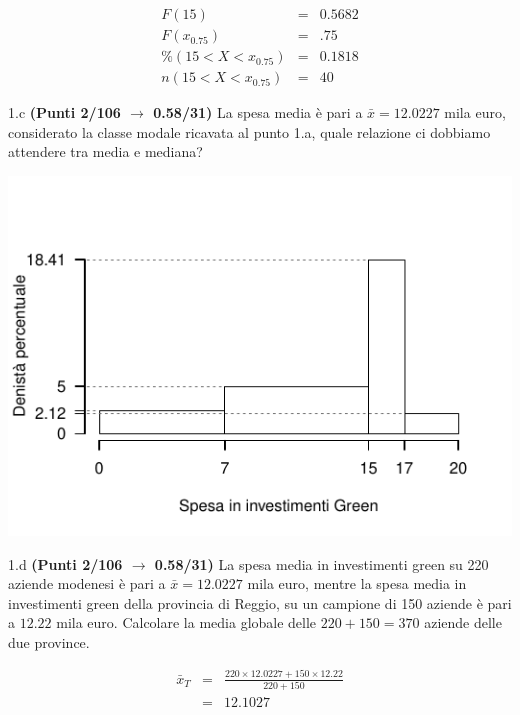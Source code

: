 \documentclass[
  11pt,
]{book}
\theoremstyle{mytheoremstyle}
\theoremstyle{mydefstyle}
\newenvironment{sol}
  {
  \begin{tcolorbox}[enhanced,breakable,arc=0.1mm,boxrule=1pt,colback=white,colframe=iblue,
  title=\bf \fontfamily{lmss}\selectfont \hspace{.5 cm} Soluzione,drop fuzzy shadow]

}{
\end{tcolorbox}
  }
\begin{document}
\begin{sol}
\begin{eqnarray*}
F(15)&=&0.5682\\
F(x_{0.75})&=&.75\\
\%(15<X<x_{0.75})&=&0.1818\\
n(15<X<x_{0.75})&=&40
\end{eqnarray*}

\end{sol}

1.c \textbf{(Punti 2/106 \(\rightarrow\) 0.58/31)} La spesa media è pari a \(\bar x=12.0227\) mila euro,
considerato la classe modale ricavata al punto 1.a, quale relazione ci dobbiamo attendere tra media e mediana?

\begin{sol}

\begin{center}\includegraphics{Esami_passati_con_soluzioni_files/figure-latex/2022-42-1} \end{center}

\end{sol}

1.d \textbf{(Punti 2/106 \(\rightarrow\) 0.58/31)} La spesa media in investimenti green su 220 aziende modenesi è pari a \(\bar x=12.0227\) mila euro, mentre la spesa media in investimenti green della provincia di Reggio, su un campione di 150 aziende è pari a \(12.22\) mila euro.
Calcolare la media globale delle \(220 + 150 = 370\) aziende delle due province.

\begin{eqnarray*}
\bar x_T&=&\frac{220\times12.0227+150\times12.22}{220+150}\\
&=& 12.1027
\end{eqnarray*}
\end{document}
